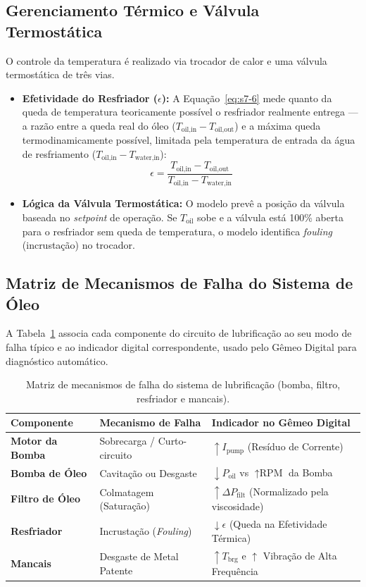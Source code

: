 \documentclass[12pt,a4paper]{article}
\numberwithin{equation}{section}
\numberwithin{table}{section}
\numberwithin{figure}{section}
\begin{document}
{	\subsection{\textbf{Gerenciamento Térmico e Válvula Termostática}}
	O controle da temperatura é realizado via trocador de calor e uma válvula termostática de três vias.
	\begin{itemize}
		\item \textbf{Efetividade do Resfriador ($\epsilon$):} A Equação~\eqref{eq:s7-6} mede quanto da queda de temperatura teoricamente possível o resfriador realmente entrega — a razão entre a queda real do óleo ($T_{\text{oil,in}} - T_{\text{oil,out}}$) e a máxima queda termodinamicamente possível, limitada pela temperatura de entrada da água de resfriamento ($T_{\text{oil,in}} - T_{\text{water,in}}$):
		\begin{equation}\label{eq:s7-6}
 \epsilon = \frac{T_{\text{oil,in}} - T_{\text{oil,out}}}{T_{\text{oil,in}} - T_{\text{water,in}}}
\end{equation}
		\item \textbf{Lógica da Válvula Termostática:} O modelo prevê a posição da válvula baseada no \textit{setpoint} de operação. Se $T_{\text{oil}}$ sobe e a válvula está 100\% aberta para o resfriador sem queda de temperatura, o modelo identifica \textit{fouling} (incrustação) no trocador.
	\end{itemize}
	
	\subsection{\textbf{Matriz de Mecanismos de Falha do Sistema de Óleo}}
	A Tabela~\ref{tab:7-1} associa cada componente do circuito de lubrificação ao seu modo de falha típico e ao indicador digital correspondente, usado pelo Gêmeo Digital para diagnóstico automático.
	\begin{table}[h!tbp]
		\centering
		\small
		\renewcommand{\arraystretch}{1.5}
		\begin{tabular}{l l l}
			\toprule
			\textbf{Componente} & \textbf{Mecanismo de Falha} & \textbf{Indicador no Gêmeo Digital} \\ \midrule
			\textbf{Motor da Bomba} & Sobrecarga / Curto-circuito & $\uparrow I_{\text{pump}}$ (Resíduo de Corrente) \\
			\textbf{Bomba de Óleo} & Cavitação ou Desgaste & $\downarrow P_{\text{oil}}$ vs $\uparrow \text{RPM}$ da Bomba \\
			\textbf{Filtro de Óleo} & Colmatagem (Saturação) & $\uparrow \Delta P_{\text{filt}}$ (Normalizado pela viscosidade) \\
			\textbf{Resfriador} & Incrustação (\textit{Fouling}) & $\downarrow \epsilon$ (Queda na Efetividade Térmica) \\
			\textbf{Mancais} & Desgaste de Metal Patente & $\uparrow T_{\text{brg}}$ e $\uparrow$ Vibração de Alta Frequência \\ \bottomrule
		\end{tabular}
		\caption[Mecanismos de falha do sistema de lubrificação]{Matriz de mecanismos de falha do sistema de lubrificação (bomba, filtro, resfriador e mancais).}
		\label{tab:7-1}
	\end{table}
	
}
\end{document}
